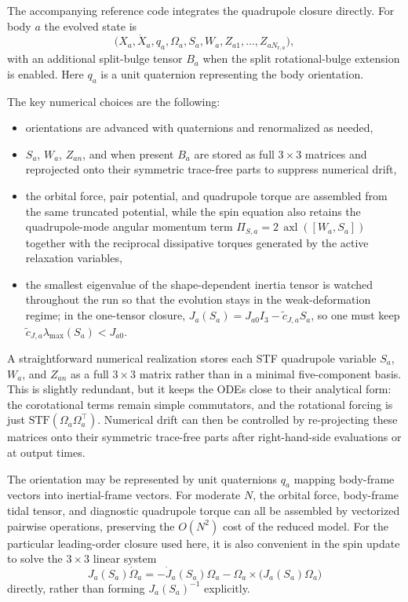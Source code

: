 \documentclass[journal, a4paper]{IEEEtran}
\begin{document}
The accompanying reference code integrates the quadrupole closure directly.
For body $a$ the evolved state is
\begin{equation}
\bigl(
X_a,\dot X_a,q_a,\Omega_a,S_a,W_a,Z_{a1},\dots,Z_{aN_{\mathrm{r},a}}
\bigr),
\end{equation}
with an additional split-bulge tensor $B_a$ when the split rotational-bulge
extension is enabled. Here $q_a$ is a unit quaternion representing the body
orientation.

The key numerical choices are the following:
\begin{itemize}
\item orientations are advanced with quaternions and renormalized as needed,
\item $S_a$, $W_a$, $Z_{an}$, and when present $B_a$ are stored as full
$3\times 3$ matrices and reprojected onto their symmetric trace-free parts to
suppress numerical drift,
\item the orbital force, pair potential, and quadrupole torque are assembled
from the same truncated potential, while the spin equation also retains the
quadrupole-mode angular momentum term
$\Pi_{S,a}=2\,\operatorname{axl}([W_a,S_a])$ together with the reciprocal
dissipative torques generated by the active relaxation variables,
\item the smallest eigenvalue of the shape-dependent inertia tensor is watched
throughout the run so that the evolution stays in the weak-deformation regime;
in the one-tensor closure,
$J_a(S_a)=J_{a0}I_3-\tilde c_{J,a}S_a$, so one must keep
$\tilde c_{J,a}\lambda_{\max}(S_a)<J_{a0}$.
\end{itemize}

A straightforward numerical realization stores each STF quadrupole variable
$S_a$, $W_a$, and $Z_{an}$ as a full $3\times 3$ matrix rather than in a
minimal five-component basis. This is slightly redundant, but it keeps the
ODEs close to their analytical form: the corotational terms remain simple
commutators, and the rotational forcing is just
$\mathrm{STF}(\Omega_a\Omega_a^\top)$. Numerical drift can then be controlled
by re-projecting these matrices onto their symmetric trace-free parts after
right-hand-side evaluations or at output times.

The orientation may be represented by unit quaternions $q_a$ mapping
body-frame vectors into inertial-frame vectors. For moderate $N$, the orbital
force, body-frame tidal tensor, and diagnostic quadrupole torque can all be
assembled by vectorized pairwise operations, preserving the $O(N^2)$ cost of
the reduced model. For the particular leading-order closure used here, it is
also convenient in the spin update to solve the $3\times 3$ linear system
\begin{equation}
J_a(S_a)\dot\Omega_a
=
-
\dot J_a(S_a)\Omega_a
-
\Omega_a\times\bigl(J_a(S_a)\Omega_a\bigr)
\end{equation}
directly, rather than forming $J_a(S_a)^{-1}$ explicitly.
\end{document}
